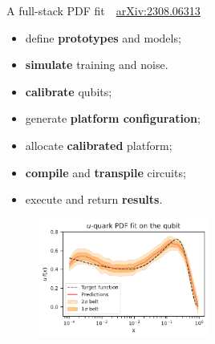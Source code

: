 \documentclass[8pt, xcolor={svgnames}, hyperref={linkcolor=black}]{beamer}
\begin{document}
\begin{frame}{A full-stack PDF fit \hfill \faBook\,\, \href{https://arxiv.org/abs/2308.06313}{arXiv:2308.06313}}

\begin{multicols}{2}
\hspace{2cm}
\begin{tcolorbox}[title=High level API: Qibo, colback=blue!20]
\begin{itemize}[noitemsep]
\small
   \item[\faCode] define \textbf{prototypes} and models;
   \item[\faCode] \textbf{simulate} training and noise.
\end{itemize}
\end{tcolorbox}
\begin{tcolorbox}[title=Calibration: Qibocal, colback=yellow!20]
\begin{itemize}[noitemsep]
\small
   \item[\faCrosshairs] \textbf{calibrate} qubits;
   \item[\faCrosshairs] generate \textbf{platform configuration};
\end{itemize}
\end{tcolorbox}
\begin{tcolorbox}[title=Execution: Qibolab, colback=red!20]
\begin{itemize}[noitemsep]
\small
   \item[\faCog] allocate \textbf{calibrated} platform;
   \item[\faCog] \textbf{compile} and \textbf{transpile} circuits;
   \item[\faCog] execute and return \textbf{results}.
\end{itemize}
\end{tcolorbox}
\pause
\begin{figure}  
    \includegraphics[width=0.5\textwidth]{figures/qpdf.pdf}
\end{figure}
\begin{table}

\end{table}
\end{multicols}
\end{frame}
\end{document}
